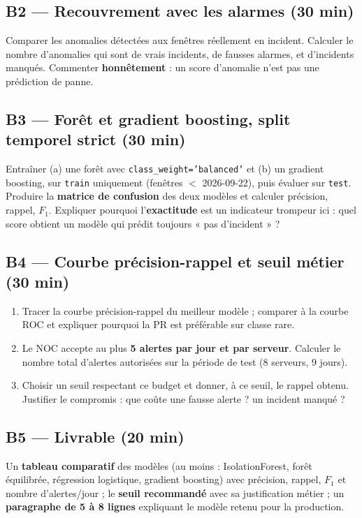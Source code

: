 \documentclass[11pt,a4paper]{article}
\newcommand{\py}[1]{\texttt{\small #1}}
\begin{document}
\subsection*{B2 --- Recouvrement avec les alarmes (30 min)}
Comparer les anomalies détectées aux fenêtres réellement en incident.
Calculer le nombre d'anomalies qui sont de vrais incidents, de fausses
alarmes, et d'incidents manqués. Commenter \textbf{honnêtement} : un score
d'anomalie n'est pas une prédiction de panne.

\subsection*{B3 --- Forêt et gradient boosting, split temporel strict (30 min)}
Entraîner (a) une forêt avec \py{class\_weight='balanced'} et (b) un gradient
boosting, sur \py{train} uniquement (fenêtres $<$ 2026-09-22), puis évaluer sur
\py{test}. Produire la \textbf{matrice de confusion} des deux modèles et
calculer précision, rappel, $F_1$. Expliquer pourquoi l'\textbf{exactitude}
est un indicateur trompeur ici : quel score obtient un modèle qui prédit
toujours « pas d'incident » ?

\subsection*{B4 --- Courbe précision-rappel et seuil métier (30 min)}
\begin{enumerate}
\item Tracer la courbe précision-rappel du meilleur modèle ; comparer à la
courbe ROC et expliquer pourquoi la PR est préférable sur classe rare.
\item Le NOC accepte au plus \textbf{5 alertes par jour et par serveur}.
Calculer le nombre total d'alertes autorisées sur la période de test
(8 serveurs, 9 jours).
\item Choisir un seuil respectant ce budget et donner, à ce seuil, le rappel
obtenu. Justifier le compromis : que coûte une fausse alerte ? un incident
manqué ?
\end{enumerate}

\subsection*{B5 --- Livrable (20 min)}
\begin{rendre}
Un \textbf{tableau comparatif} des modèles (au moins : IsolationForest, forêt
équilibrée, régression logistique, gradient boosting) avec précision, rappel,
$F_1$ et nombre d'alertes/jour ; le \textbf{seuil recommandé} avec sa
justification métier ; un \textbf{paragraphe de 5 à 8 lignes} expliquant le
modèle retenu pour la production.
\end{rendre}
\end{document}
